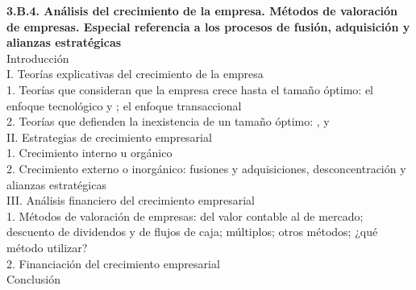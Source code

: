 \documentclass[11pt]{article}
\begin{document}
\begin{esquema}
\textbf{3.B.4. Análisis del crecimiento de la empresa. Métodos de valoración de empresas. Especial referencia a los procesos de fusión, adquisición y alianzas estratégicas}\\[2pt]
Introducción\\
I. Teorías explicativas del crecimiento de la empresa\\
\hspace*{1.5em}1. Teorías que consideran que la empresa crece hasta el tamaño óptimo: el enfoque tecnológico y ; el enfoque transaccional\\
\hspace*{1.5em}2. Teorías que defienden la inexistencia de un tamaño óptimo: ,  y \\
II. Estrategias de crecimiento empresarial\\
\hspace*{1.5em}1. Crecimiento interno u orgánico\\
\hspace*{1.5em}2. Crecimiento externo o inorgánico: fusiones y adquisiciones, desconcentración y alianzas estratégicas\\
III. Análisis financiero del crecimiento empresarial\\
\hspace*{1.5em}1. Métodos de valoración de empresas: del valor contable al de mercado; descuento de dividendos y de flujos de caja; múltiplos; otros métodos; ¿qué método utilizar?\\
\hspace*{1.5em}2. Financiación del crecimiento empresarial\\
Conclusión
\end{esquema}

\begin{infografia}[H]
\centering
\caption{Mapa del tema: la pregunta de cada bloque y el hilo que los une}\label{figu:mapa-tema}
\end{infografia}
\end{document}
